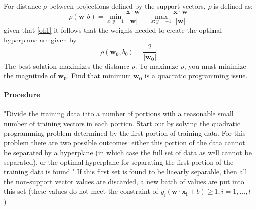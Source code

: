 			\paragraph{}
			For distance $\rho$ between projections defined by the support vectors, $\rho$ is defined as:
			\begin{equation}\rho(\mathbf{w}, b) = \min_{x:y=1} \frac{\mathbf{x} \cdot \mathbf{w}}{ |\mathbf{w}|} - \max_{x:y=-1} \frac{\mathbf{x} \cdot \mathbf{w}}{|\mathbf{w}|}\end{equation}
			given that \eqref{oh1} it follows that the weights needed to create the optimal hyperplane are given by
			\begin{equation}\label{oh2} \rho (\mathbf{w_0}, b_0) = \frac{2}{|\mathbf{w_0}|}\end{equation}  The best solution maximizes the distance $\rho$.  To maximize $\rho$, you must minimize the magnitude of $\mathbf{w_0}$.  Find that minimum $\mathbf{w_0}$ is a quadratic programming issue.\cite{vapnik_support-vector_1995}

			\paragraph{Procedure} "Divide the training data into a number of portions with a reasonable small number of training vectors in each portion.  Start out by solving the quadratic programming problem determined by the first portion of training data.  For this problem there are two possible outcomes: either this portion of the data cannot be separated by a hyperplane (in which case the full set of data as well cannot be separated), or the optimal hyperplane for separating the first portion of the training data is found." If this first set is found to be linearly separable, then all the non-support vector values are discarded, a new batch of values are put into this set (these values do not meet the constraint of $y_i(\mathbf{w} \cdot \mathbf{x_i} + b) \ge 1, i = 1,...,{l}$ )

